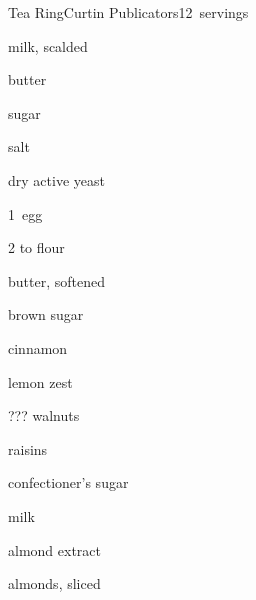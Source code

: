 \begin{recipe}{Tea Ring\FIXME}{Curtin Publicators}{12~servings}

\begin{ingredients}
\item \C{\twothird} milk, scalded
\item \C{\quarter} butter
\item \C{\quarter} sugar
\item \tp{\half} salt
\item \tp{2\quarter} dry active yeast
\item 1~egg
\item 2\half{} to  flour
\item {} butter, softened
\item \C{\half} brown sugar
\item {} cinnamon
\item {} lemon zest
\item ??? walnuts
\item \C{\half} raisins
\item \C{\half} confectioner's sugar
\item {} milk
\item \tp{\half} almond extract
\item {} almonds, sliced
\end{ingredients}


\end{recipe}
